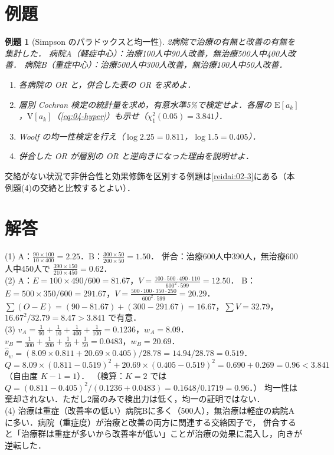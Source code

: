 \documentclass[a4paper,11pt,openany]{ltjsbook}
\newtheorem{reidai}{例題}[chapter]
\newenvironment{kaitou}[1]{%
  \par\medskip\noindent
  \begin{tcolorbox}[enhanced,breakable,colback=bkgray!3,colframe=bkgray!60,boxrule=0.4pt,
    left=4pt,right=4pt,top=2pt,bottom=2pt,arc=1pt,
    title={\cref{#1}の解答},fonttitle=\bfseries\small,coltitle=white,colbacktitle=bkgray!80]}%
  {\end{tcolorbox}\par}
\newcommand{\E}{\mathrm{E}}
\newcommand{\V}{\mathrm{V}}
\begin{document}
\section{例題}\label{sec:07-ex}
\begin{reidai}[Simpson のパラドックスと均一性]\label{reidai:07-1}
2病院で治療の有無と改善の有無を集計した．
病院A（軽症中心）：治療100人中90人改善，無治療500人中400人改善．
病院B（重症中心）：治療500人中300人改善，無治療100人中50人改善．
\begin{enumerate}[label=(\arabic*)]
\item 各病院の OR と，併合した表の OR を求めよ．
\item 層別 Cochran 検定の統計量を求め，有意水準5\%で検定せよ．各層の $\E[a_k]$，$\V[a_k]$（\cref{eq:04-hyper}）も示せ（$\chi^2_1(0.05)=3.841$）．
\item Woolf の均一性検定を行え（$\log2.25=0.811$，$\log1.5=0.405$）．
\item 併合した OR が層別の OR と逆向きになった理由を説明せよ．
\end{enumerate}
\end{reidai}
交絡がない状況で非併合性と効果修飾を区別する例題は\cref{reidai:02-3}にある（本例題(4)の交絡と比較するとよい）．

\section{解答}\label{sec:07-sol}
\begin{kaitou}{reidai:07-1}
(1) A：$\frac{90\times100}{10\times400}=2.25$．B：$\frac{300\times50}{200\times50}=1.50$．
併合：治療600人中390人，無治療600人中450人で $\frac{390\times150}{210\times450}=0.62$．\\
(2) A：$E=100\times490/600=81.67$，$V=\frac{100\cdot500\cdot490\cdot110}{600^2\cdot599}=12.50$．
B：$E=500\times350/600=291.67$，$V=\frac{500\cdot100\cdot350\cdot250}{600^2\cdot599}=20.29$．
$\sum(O-E)=(90-81.67)+(300-291.67)=16.67$，$\sum V=32.79$，$16.67^2/32.79=8.47>3.841$ で有意．\\
(3) $v_A=\frac1{90}+\frac1{10}+\frac1{400}+\frac1{100}=0.1236$，$w_A=8.09$．
$v_B=\frac1{300}+\frac1{200}+\frac1{50}+\frac1{50}=0.0483$，$w_B=20.69$．
$\hat\theta_w=(8.09\times0.811+20.69\times0.405)/28.78=14.94/28.78=0.519$．
$Q=8.09\times(0.811-0.519)^2+20.69\times(0.405-0.519)^2=0.690+0.269=0.96<3.841$（自由度 $K-1=1$）．
（検算：$K=2$ では $Q=(0.811-0.405)^2/(0.1236+0.0483)=0.1648/0.1719=0.96$．）
均一性は棄却されない．ただし2層のみで検出力は低く，均一の証明ではない．\\
(4) 治療は重症（改善率の低い）病院Bに多く（500人），無治療は軽症の病院Aに多い．病院（重症度）が治療と改善の両方に関連する交絡因子で，
併合すると「治療群は重症が多いから改善率が低い」ことが治療の効果に混入し，向きが逆転した．
\end{kaitou}
\end{document}
